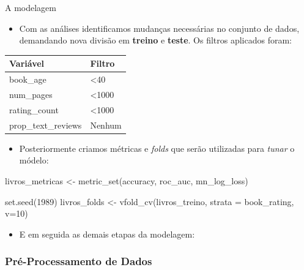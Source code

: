 \documentclass[
  9 pt,
  ignorenonframetext,
]{beamer}
\newenvironment{Shaded}{\begin{snugshade}}{\end{snugshade}}
\newcommand{\AttributeTok}[1]{\textcolor[rgb]{0.77,0.63,0.00}{#1}}
\newcommand{\DecValTok}[1]{\textcolor[rgb]{0.00,0.00,0.81}{#1}}
\newcommand{\FunctionTok}[1]{\textcolor[rgb]{0.00,0.00,0.00}{#1}}
\newcommand{\NormalTok}[1]{#1}
\newcommand{\OtherTok}[1]{\textcolor[rgb]{0.56,0.35,0.01}{#1}}
\providecommand{\tightlist}{%
  \setlength{\itemsep}{0pt}\setlength{\parskip}{0pt}}
\begin{document}
\begin{frame}[fragile]{A modelagem}
\begin{itemize}
\tightlist
\item
  Com as análises identificamos mudanças necessárias no conjunto de
  dados, demandando nova divisão em \textbf{treino} e \textbf{teste}. Os
  filtros aplicados foram:
\end{itemize}

\begin{table}[H]
\centering
\begin{tabular}{ll}
\toprule
Variável & Filtro\\
\midrule
book\_age & <40\\
num\_pages & <1000\\
rating\_count & <1000\\
prop\_text\_reviews & Nenhum\\
\bottomrule
\end{tabular}
\end{table}

\begin{itemize}
\tightlist
\item
  Posteriormente criamos métricas e \emph{folds} que serão utilizadas
  para \emph{tunar} o módelo:
\end{itemize}

\begin{Shaded}
\begin{Highlighting}[]
\NormalTok{livros\_metricas }\OtherTok{\textless{}{-}} \FunctionTok{metric\_set}\NormalTok{(accuracy, roc\_auc, mn\_log\_loss)}

\FunctionTok{set.seed}\NormalTok{(}\DecValTok{1989}\NormalTok{)}
\NormalTok{livros\_folds }\OtherTok{\textless{}{-}} \FunctionTok{vfold\_cv}\NormalTok{(livros\_treino, }\AttributeTok{strata =}\NormalTok{ book\_rating, }\AttributeTok{v=}\DecValTok{10}\NormalTok{)}
\end{Highlighting}
\end{Shaded}

\begin{itemize}
\tightlist
\item
  E em seguida as demais etapas da modelagem:
\end{itemize}
\end{frame}

\hypertarget{pruxe9-processamento-de-dados}{%
\subsubsection{Pré-Processamento de
Dados}\label{pruxe9-processamento-de-dados}}
\end{document}
